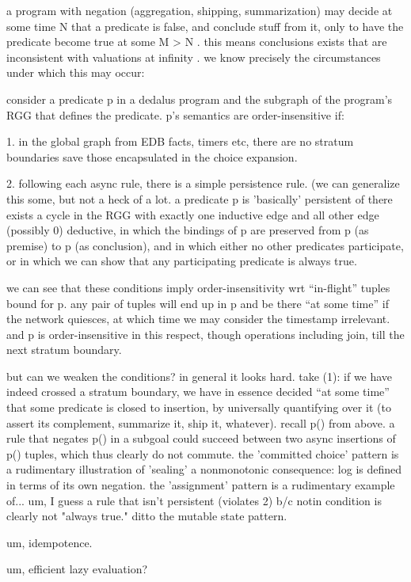 a program with negation (aggregation, shipping, summarization) may decide at some time N
that a predicate is false, and conclude stuff from it, only to have the predicate become
true at some M > N .  this means conclusions exists that are inconsistent with valuations at
infinity .  we know precisely the circumstances under which this may occur:

consider a predicate p in a dedalus program and the subgraph of the program's RGG that 
defines the predicate.  p's semantics are order-insensitive if:

1. in the global graph from EDB facts, timers etc, there are no stratum boundaries save those encapsulated in the choice expansion.

2. following each async rule, there is a simple persistence rule.  (we can generalize this some,
but not a heck of a lot.  a predicate p is 'basically' persistent of there exists a cycle in the RGG 
with exactly one inductive edge and all other edge (possibly 0) deductive, in which the 
bindings of p are preserved from p (as premise) to p (as conclusion), and in which either no other predicates participate, or in which we can show that any participating predicate is always true.

we can see that these conditions imply order-insensitivity wrt ``in-flight'' tuples bound for p.
any pair of tuples will end up in p and be there ``at some time'' if the network quiesces, at 
which time we may consider the timestamp irrelevant.  and p is order-insensitive in this respect,
though operations including join, till the next stratum boundary.

but can we weaken the conditions?  in general it looks hard.  take (1): if we have indeed crossed a stratum boundary, we have in essence decided ``at some time'' that some predicate is closed to insertion, by universally quantifying over it (to assert its complement, summarize it, ship it, whatever).  recall p() from above.  a rule that negates p() in a subgoal could succeed between 
two async insertions of p() tuples, which thus clearly do not commute.  the 'committed choice'
pattern is a rudimentary illustration of 'sealing' a nonmonotonic consequence: log is defined 
in terms of its own negation.  the 'assignment' pattern is a rudimentary example of... um, I guess a rule that isn't persistent (violates 2) b/c notin condition is clearly not "always true."  ditto the
mutable state pattern.




um, idempotence.

um, efficient lazy evaluation?  \cite{magic}
